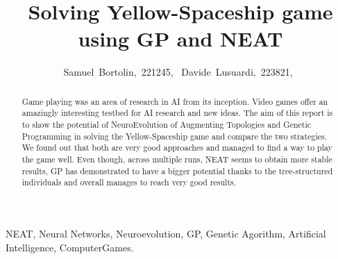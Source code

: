 \documentclass[journal]{IEEEtran}
\begin{document}
%
\title{Solving Yellow-Spaceship game \\using GP and NEAT}
%
%
%

\author{Samuel~Bortolin,~221245,~
        Davide~Lusuardi,~223821,~%
}

%
{}

\maketitle

\begin{abstract}
  Game playing was an area of research in AI from its inception. 
  Video games offer an amazingly interesting testbed for AI research and new ideas. 
  The aim of this report is to show the potential of NeuroEvolution of Augmenting Topologies and Genetic Programming
  in solving the Yellow-Spaceship game and compare the two strategies. 
  We found out that both are very good approaches and managed to find a way to play the game well. 
  Even though, across multiple runs, NEAT seems to obtain more stable results, GP has demonstrated to have 
  a bigger potential thanks to the tree-structured individuals and overall manages to reach very good results.
\end{abstract}

\begin{IEEEkeywords}
NEAT, Neural Networks, Neuroevolution, GP, Genetic Agorithm, Artificial Intelligence, ComputerGames.
\end{IEEEkeywords}
\end{document}
